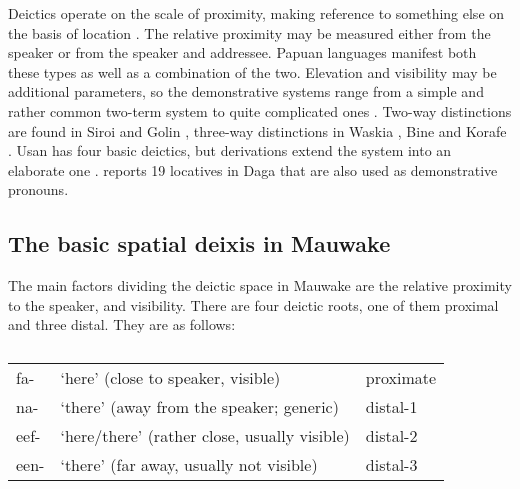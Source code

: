Deictics operate on the scale of proximity, making reference to something else on the basis of location \citep[57--58]{HallidayEtAl1976}. The relative proximity may be measured either from the speaker or from the speaker and addressee. Papuan languages manifest both these types as well as a combination of the two. Elevation and visibility may be additional parameters, so the demonstrative systems range from a simple and rather common two-term system to quite complicated ones \citep[75--77]{Foley1986}. Two-way distinctions are found in Siroi \citep[20]{Wells1979} and Golin \citep{Bunn1974}, three-way distinctions in Waskia \citep[59]{RossEtAl1978}%
, Bine \citep{Saari1985} and Korafe \citep[65]{FarrEtAl1981}%
. Usan has four basic deictics, but derivations extend the system into an elaborate one \citep[76--81]{Reesink1987}. \citet[38--39]{Murane1974} reports 19 locatives in Daga that are also used as demonstrative pronouns. 

\subsection{The basic spatial deixis in Mauwake}
{}
The main factors dividing the deictic space in Mauwake are the relative proximity to the speaker, and visibility. There are four deictic roots, one of them proximal and three distal. They are as follows: 

\begin{table}
\caption{}
\label{} 
\begin{tabular}{lll}
fa- &`here' (close to speaker, visible) &proximate\\
na- &`there' (away from the speaker; generic) &distal-1\\
eef- &`here/there' (rather close, usually visible) &distal-2\\
een- &`there' (far away, usually not visible) &distal-3\\
\end{tabular}
\end{table}



